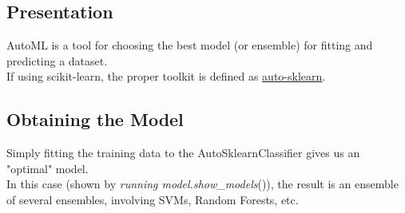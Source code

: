 \subsection{Presentation}
AutoML is a tool for choosing the best model (or ensemble) for fitting and predicting a dataset.\\
If using scikit-learn, the proper toolkit is defined as \href{https://automl.github.io/auto-sklearn/}{auto-sklearn}.

\subsection{Obtaining the Model}
Simply fitting the training data to the AutoSklearnClassifier gives us an "optimal" model.\\
In this case (shown by \emph{running model.show\_models}()), the result is an ensemble of several ensembles, involving SVMs, Random Forests, etc.
